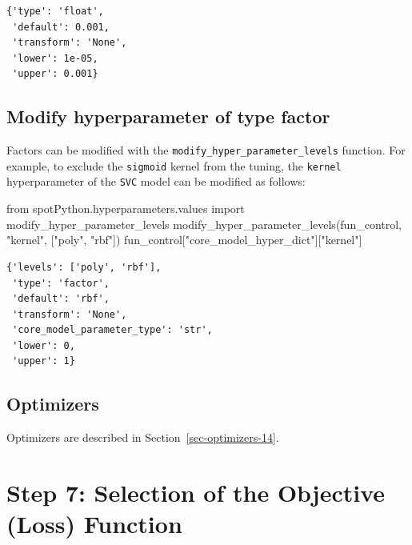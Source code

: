 \documentclass[
  letterpaper,
  DIV=11,
  numbers=noendperiod]{scrreprt}
\newenvironment{Shaded}{\begin{snugshade}}{\end{snugshade}}
\newcommand{\ImportTok}[1]{\textcolor[rgb]{0.00,0.46,0.62}{#1}}
\newcommand{\NormalTok}[1]{\textcolor[rgb]{0.00,0.23,0.31}{#1}}
\newcommand{\StringTok}[1]{\textcolor[rgb]{0.13,0.47,0.30}{#1}}
\begin{document}
\begin{verbatim}
{'type': 'float',
 'default': 0.001,
 'transform': 'None',
 'lower': 1e-05,
 'upper': 0.001}
\end{verbatim}

\hypertarget{modify-hyperparameter-of-type-factor}{%
\subsection{Modify hyperparameter of type
factor}\label{modify-hyperparameter-of-type-factor}}

Factors can be modified with the
\texttt{modify\_hyper\_parameter\_levels} function. For example, to
exclude the \texttt{sigmoid} kernel from the tuning, the \texttt{kernel}
hyperparameter of the \texttt{SVC} model can be modified as follows:

\begin{Shaded}
\begin{Highlighting}[]
\ImportTok{from}\NormalTok{ spotPython.hyperparameters.values }\ImportTok{import}\NormalTok{ modify\_hyper\_parameter\_levels}
\NormalTok{modify\_hyper\_parameter\_levels(fun\_control, }\StringTok{"kernel"}\NormalTok{, [}\StringTok{"poly"}\NormalTok{, }\StringTok{"rbf"}\NormalTok{])}
\NormalTok{fun\_control[}\StringTok{"core\_model\_hyper\_dict"}\NormalTok{][}\StringTok{"kernel"}\NormalTok{]}
\end{Highlighting}
\end{Shaded}

\begin{verbatim}
{'levels': ['poly', 'rbf'],
 'type': 'factor',
 'default': 'rbf',
 'transform': 'None',
 'core_model_parameter_type': 'str',
 'lower': 0,
 'upper': 1}
\end{verbatim}

\hypertarget{sec-optimizers-10}{%
\subsection{Optimizers}\label{sec-optimizers-10}}

Optimizers are described in Section~\ref{sec-optimizers-14}.

\hypertarget{step-7-selection-of-the-objective-loss-function}{%
\section{Step 7: Selection of the Objective (Loss)
Function}\label{step-7-selection-of-the-objective-loss-function}}
\end{document}
